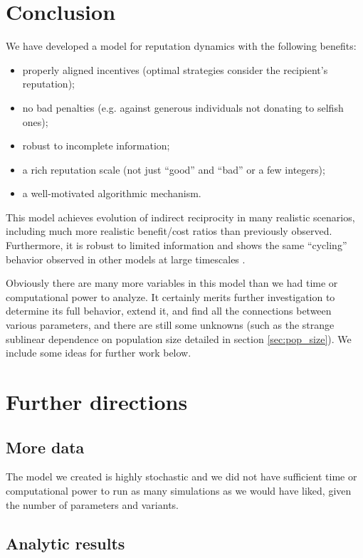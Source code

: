 \documentclass{amsart}
\begin{document}
\section{Conclusion}
\label{sec:conclusion}

We have developed a model for reputation dynamics with the following
benefits:

\begin{itemize}
\item properly aligned incentives (optimal strategies consider the
  recipient's reputation);
\item no bad penalties (e.g. against generous individuals not donating
  to selfish ones);
\item robust to incomplete information;
\item a rich reputation scale (not just ``good'' and ``bad'' or a few
  integers);
\item a well-motivated algorithmic mechanism.
\end{itemize}

This model achieves evolution of indirect reciprocity in many
realistic scenarios, including much more realistic benefit/cost ratios
than previously observed. Furthermore, it is robust to limited
information and shows the same ``cycling'' behavior observed in other
models at large timescales \cite{nowak_evolution_1998}.

Obviously there are many more variables in this model than we had time
or computational power to analyze. It certainly merits further
investigation to determine its full behavior, extend it, and find all
the connections between various parameters, and there are still some
unknowns (such as the strange sublinear dependence on population size
detailed in section \ref{sec:pop_size}). We include some ideas for
further work below.

\section{Further directions}

\subsection{More data}

The model we created is highly stochastic and we did not have
sufficient time or computational power to run as many simulations as
we would have liked, given the number of parameters and variants.

\subsection{Analytic results}
\end{document}
